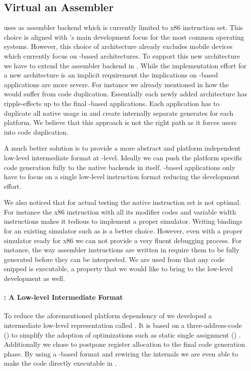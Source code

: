 \subsection{Virtual \CPU an Assembler \DSL}
\B uses \AsmJIT as assembler backend which is currently limited to x86 instruction set.
This choice is aligned with \PH's main development focus for the most common operating systems.
However, this choice of architecture already excludes mobile devices which currently focus on \ARM-based architectures.
To support this new architecture we have to extend the assembler backend in \AsmJIT.
While the implementation effort for a new \AsmJIT architecture is an implicit requirement the implications on \B-based applications are more severe.
For instance we already mentioned in  how the \NB \FFI would suffer from code duplication.
Essentially each newly added \CPU architecture has ripple-effects up to the final \B-based applications.
Each \B application has to duplicate all native usage in and create internally separate generates for each platform.
We believe that this approach is not the right path as it forces \B users into code duplication.

A much better solution is to provide a more abstract and platform independent low-level intermediate format at \B-level.
Ideally we can push the platform specific code generation fully to the native backends in \B itself.
\B-based applications only have to focus on a single low-level instruction format reducing the development effort.


We also noticed that for actual testing the native instruction set is not optimal.
For instance the x86 instruction with all its modifier codes and variable width instructions makes it tedious to implement a proper simulator.
Writing bindings for an existing simulator such as  is a better choice.
However, even with a proper simulator ready for x86 we can not provide a very fluent debugging process.
For instance, the way assembler instructions are written in \B require them to be fully generated before they can be interpreted.
We are used from \PH that any code snipped is executable, a property that we would like to bring to the low-level development as well.

\paragraph{\VCPU: A Low-level Intermediate Format}
To reduce the aforementioned platform dependency of \B we developed a intermediate low-level representation called \VCPU.
It is based on a three-address-code (\TAC) \cite{??} to simplify the adoption of optimizations such as static single assignment (\SSA) \cite{??}.
Additionally we chose to postpone register allocation to the final code generation phase.
By using a \TAC-based format and rewiring the internals we are even able to make the \VCPU code directly executable in \PH.


